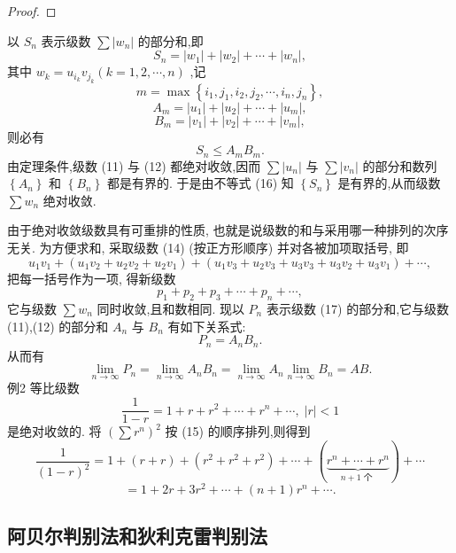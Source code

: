 \begin{proof}

\end{proof}
以 \({S}_{n}\) 表示级数 \(\sum \left| {w}_{n}\right|\) 的部分和,即
\[
{S}_{n} = \left| {w}_{1}\right|  + \left| {w}_{2}\right|  + \cdots  + \left| {w}_{n}\right| ,
\]
其中 \({w}_{k} = {u}_{{i}_{k}}{v}_{{j}_{k}}\left( {k = 1,2,\cdots ,n}\right)\) ,记
\[
m = \max \left\{  {{i}_{1},{j}_{1},{i}_{2},{j}_{2},\cdots ,{i}_{n},{j}_{n}}\right\}  ,
\]
\[
{A}_{m} = \left| {u}_{1}\right|  + \left| {u}_{2}\right|  + \cdots  + \left| {u}_{m}\right| ,
\]
\[
{B}_{m} = \left| {v}_{1}\right|  + \left| {v}_{2}\right|  + \cdots  + \left| {v}_{m}\right| ,
\]
则必有
\[
{S}_{n} \leq  {A}_{m}{B}_{m}. \tag{16}
\]
由定理条件,级数 (11) 与 (12) 都绝对收敛,因而 \(\sum \left| {u}_{n}\right|\) 与 \(\sum \left| {v}_{n}\right|\) 的部分和数列 \(\left\{  {A}_{n}\right\}\) 和 \(\left\{  {B}_{n}\right\}\) 都是有界的. 于是由不等式 (16) 知 \(\left\{  {S}_{n}\right\}\) 是有界的,从而级数 \(\sum {w}_{n}\) 绝对收敛.

由于绝对收敛级数具有可重排的性质, 也就是说级数的和与采用哪一种排列的次序无关. 为方便求和, 采取级数 (14) (按正方形顺序) 并对各被加项取括号, 即
\[
{u}_{1}{v}_{1} + \left( {{u}_{1}{v}_{2} + {u}_{2}{v}_{2} + {u}_{2}{v}_{1}}\right)  + \left( {{u}_{1}{v}_{3} + {u}_{2}{v}_{3} + {u}_{3}{v}_{3} + {u}_{3}{v}_{2} + {u}_{3}{v}_{1}}\right)  + \cdots ,
\]
把每一括号作为一项, 得新级数
\[
{p}_{1} + {p}_{2} + {p}_{3} + \cdots  + {p}_{n} + \cdots , \tag{17}
\]
它与级数 \(\sum {w}_{n}\) 同时收敛,且和数相同. 现以 \({P}_{n}\) 表示级数 (17) 的部分和,它与级数 (11),(12) 的部分和 \({A}_{n}\) 与 \({B}_{n}\) 有如下关系式:
\[
{P}_{n} = {A}_{n}{B}_{n}.
\]
从而有
\[
\mathop{\lim }\limits_{{n \rightarrow  \infty }}{P}_{n} = \mathop{\lim }\limits_{{n \rightarrow  \infty }}{A}_{n}{B}_{n} = \mathop{\lim }\limits_{{n \rightarrow  \infty }}{A}_{n}\mathop{\lim }\limits_{{n \rightarrow  \infty }}{B}_{n} = {AB}.
\]
例2 等比级数
\[
\frac{1}{1 - r} = 1 + r + {r}^{2} + \cdots  + {r}^{n} + \cdots ,\;\left| r\right|  < 1
\]
是绝对收敛的. 将 \({\left( \sum {r}^{n}\right) }^{2}\) 按 (15) 的顺序排列,则得到
\[
\frac{1}{{\left( 1 - r\right) }^{2}} = 1 + \left( {r + r}\right)  + \left( {{r}^{2} + {r}^{2} + {r}^{2}}\right)  + \cdots  + \left( \underset{n + 1\text{ 个 }}{\underbrace{{r}^{n} + \cdots  + {r}^{n}}}\right)  + \cdots
\]
\[
= 1 + {2r} + 3{r}^{2} + \cdots  + \left( {n + 1}\right) {r}^{n} + \cdots .
\]
\subsection{阿贝尔判别法和狄利克雷判别法}

